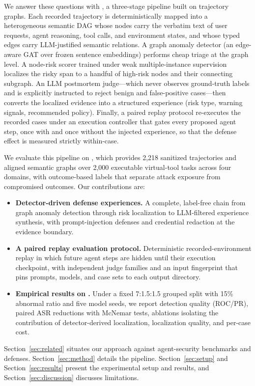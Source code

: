 We answer these questions with \method{}, a three-stage pipeline built on trajectory graphs. Each recorded trajectory is deterministically mapped into a heterogeneous semantic DAG whose nodes carry the verbatim text of user requests, agent reasoning, tool calls, and environment states, and whose typed edges carry LLM-justified semantic relations. A graph anomaly detector (an edge-aware GAT over frozen sentence embeddings) performs cheap triage at the graph level. A node-risk scorer trained under weak multiple-instance supervision localizes the risky span to a handful of high-risk nodes and their connecting subgraph. An LLM postmortem judge---which never observes ground-truth labels and is explicitly instructed to reject benign and false-positive cases---then converts the localized evidence into a structured experience (risk type, warning signals, recommended policy). Finally, a paired replay protocol re-executes the recorded cases under an execution controller that gates every proposed agent step, once with and once without the injected experience, so that the defense effect is measured strictly within-case.

We evaluate this pipeline on \tool{}, which provides 2{,}218 sanitized trajectories and aligned semantic graphs over 2{,}000 executable virtual-tool tasks across four domains, with outcome-based labels that separate attack exposure from compromised outcomes. Our contributions are:
\begin{itemize}
\item \textbf{Detector-driven defense experiences.} A complete, label-free chain from graph anomaly detection through risk localization to LLM-filtered experience synthesis, with prompt-injection defenses and credential redaction at the evidence boundary.
\item \textbf{A paired replay evaluation protocol.} Deterministic recorded-environment replay in which future agent steps are hidden until their execution checkpoint, with independent judge families and an input fingerprint that pins prompts, models, and case sets to each output directory.
\item \textbf{Empirical results on \tool{}.} Under a fixed 7:1.5:1.5 grouped split with 15\% abnormal ratio and five model seeds, we report detection quality (ROC/PR), paired ASR reductions with McNemar tests, ablations isolating the contribution of detector-derived localization, localization quality, and per-case cost.
\end{itemize}

Section~\ref{sec:related} situates our approach against agent-security benchmarks and defenses. Section~\ref{sec:method} details the pipeline. Section~\ref{sec:setup} and Section~\ref{sec:results} present the experimental setup and results, and Section~\ref{sec:discussion} discusses limitations.
